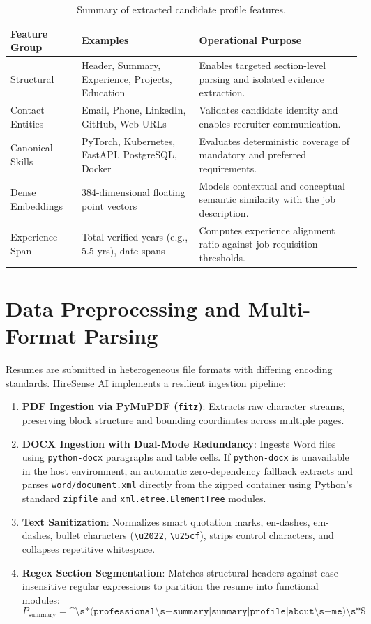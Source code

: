 \documentclass[12pt,a4paper]{report}
\begin{document}
\begin{table}[h!]
\centering
\caption{Summary of extracted candidate profile features.}
\label{tab:feature_summary}
\begin{tabular}{|p{3cm}|p{4.5cm}|p{6.5cm}|}
\hline
\textbf{Feature Group} & \textbf{Examples} & \textbf{Operational Purpose} \\ \hline
Structural & Header, Summary, Experience, Projects, Education & Enables targeted section-level parsing and isolated evidence extraction. \\ \hline
Contact Entities & Email, Phone, LinkedIn, GitHub, Web URLs & Validates candidate identity and enables recruiter communication. \\ \hline
Canonical Skills & PyTorch, Kubernetes, FastAPI, PostgreSQL, Docker & Evaluates deterministic coverage of mandatory and preferred requirements. \\ \hline
Dense Embeddings & 384-dimensional floating point vectors & Models contextual and conceptual semantic similarity with the job description. \\ \hline
Experience Span & Total verified years (e.g., 5.5 yrs), date spans & Computes experience alignment ratio against job requisition thresholds. \\ \hline
\end{tabular}
\end{table}

\section{Data Preprocessing and Multi-Format Parsing}
Resumes are submitted in heterogeneous file formats with differing encoding standards. HireSense AI implements a resilient ingestion pipeline:
\begin{enumerate}
    \item \textbf{PDF Ingestion via PyMuPDF (\texttt{fitz})}: Extracts raw character streams, preserving block structure and bounding coordinates across multiple pages.
    \item \textbf{DOCX Ingestion with Dual-Mode Redundancy}: Ingests Word files using \texttt{python-docx} paragraphs and table cells. If \texttt{python-docx} is unavailable in the host environment, an automatic zero-dependency fallback extracts and parses \texttt{word/document.xml} directly from the zipped container using Python's standard \texttt{zipfile} and \texttt{xml.etree.ElementTree} modules.
    \item \textbf{Text Sanitization}: Normalizes smart quotation marks, en-dashes, em-dashes, bullet characters (\texttt{\textbackslash u2022}, \texttt{\textbackslash u25cf}), strips control characters, and collapses repetitive whitespace.
    \item \textbf{Regex Section Segmentation}: Matches structural headers against case-insensitive regular expressions to partition the resume into functional modules:
    \begin{equation}
    P_{\text{summary}} = \texttt{\textasciicircum\textbackslash s*(professional\textbackslash s+summary|summary|profile|about\textbackslash s+me)\textbackslash s*\$}
    \end{equation}
\end{enumerate}
\end{document}
